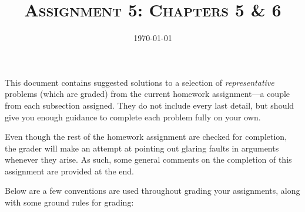 \documentclass{amsart}
\title{\textsc{Assignment 5: Chapters 5 \& 6}}
\date{\today}
\theoremstyle{definition}
\theoremstyle{definition}
\DeclareMathOperator{\1}{\mathbbm{1}}
\begin{document}
	\sloppy
	\maketitle
	
	
	This document contains suggested solutions to a selection of \textit{representative} problems (which are graded) from the current homework assignment---a couple from each subsection assigned. They do not include every last detail, but should give you enough guidance to complete each problem fully on your own. 
	
	Even though the rest of the homework assignment are checked for completion, the grader will make an attempt at pointing out glaring faults in arguments whenever they arise. As such, some general comments on the completion of this assignment are provided at the end. 
	
	Below are a few conventions are used throughout grading your assignments, along with some ground rules for grading:
	
\end{document}
